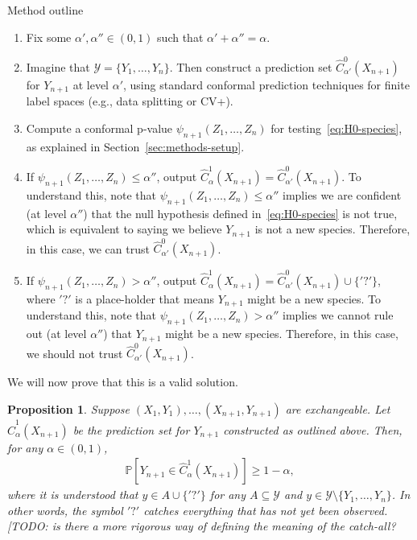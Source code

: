 \documentclass[11pt]{article}
\newtheorem{proposition}{Proposition}
\renewcommand{\P}[1]{\mathbb{P}\left[#1\right]}
\begin{document}
Method outline
\begin{enumerate}
\item Fix some $\alpha',\alpha'' \in (0,1)$ such that $\alpha' + \alpha'' = \alpha$.
\item Imagine that $\mathcal{Y} = \{Y_1, \ldots, Y_n\}$. Then construct a prediction set $\hat{C}^0_{\alpha'}(X_{n+1})$ for $Y_{n+1}$ at level $\alpha'$, using standard conformal prediction techniques for finite label spaces (e.g., data splitting or CV+).
\item Compute a conformal p-value $\psi_{n+1}(Z_1, \ldots, Z_n)$ for testing~\eqref{eq:H0-species}, as explained in Section~\ref{sec:methods-setup}.
\item If $\psi_{n+1}(Z_1, \ldots, Z_n) \leq \alpha''$, output $\hat{C}^{1}_{\alpha}(X_{n+1}) = \hat{C}^0_{\alpha'}(X_{n+1})$. To understand this, note that $\psi_{n+1}(Z_1, \ldots, Z_n) \leq \alpha''$ implies we are confident (at level $\alpha''$) that the null hypothesis defined in~\eqref{eq:H0-species} is not true, which is equivalent to saying we believe $Y_{n+1}$ is not a new species. Therefore, in this case, we can trust $\hat{C}^0_{\alpha'}(X_{n+1})$.
\item If $\psi_{n+1}(Z_1, \ldots, Z_n) > \alpha''$, output $\hat{C}^{1}_{\alpha}(X_{n+1}) = \hat{C}^0_{\alpha'}(X_{n+1}) \cup \{'?'\}$, where $'?'$ is a place-holder that means $Y_{n+1}$ might be a new species. To understand this, note that $\psi_{n+1}(Z_1, \ldots, Z_n) > \alpha''$ implies we cannot rule out (at level $\alpha''$) that $Y_{n+1}$ might be a new species. Therefore, in this case, we should not trust $\hat{C}^0_{\alpha'}(X_{n+1})$.
\end{enumerate}

We will now prove that this is a valid solution.


\begin{proposition} \label{eq:coverage}
Suppose $(X_1,Y_1),\ldots,(X_{n+1},Y_{n+1})$ are exchangeable. Let $\hat{C}^{1}_{\alpha}(X_{n+1}) $ be the prediction set for $Y_{n+1}$ constructed as outlined above.
Then, for any $\alpha \in (0,1)$,
\begin{align*}
  \P{ Y_{n+1} \in \hat{C}^1_{\alpha}(X_{n+1})} \geq 1-\alpha,
\end{align*}
where it is understood that $y \in A \cup \{'?'\}$ for any $A \subseteq \mathcal{Y}$ and $y \in \mathcal{Y} \setminus \{Y_1, \ldots, Y_n\}$. In other words, the symbol $'?'$ catches everything that has not yet been observed.  {\color{red}[TODO: is there a more rigorous way of defining the meaning of the catch-all?}
\end{proposition}
\end{document}
